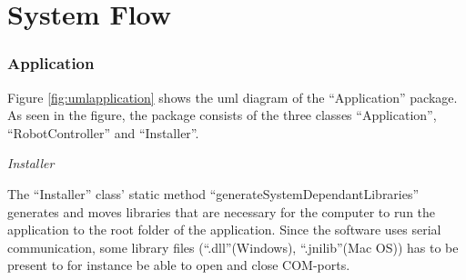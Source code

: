 \section{System Flow}
\subsubsection{Application}
Figure \ref{fig:umlapplication} shows the \acrfull{uml} diagram of the ``Application'' package. As seen in the figure, the package consists of the three classes ``Application'', ``RobotController'' and ``Installer''.

\textit{Installer}

The ``Installer'' class' static method ``generateSystemDependantLibraries'' generates and moves libraries that are necessary for the computer to run the application to the root folder of the application. Since the software uses serial communication, some library files (``.dll''(Windows), ``.jnilib''(Mac OS)) has to be present to for instance be able to open and close COM-ports. 


